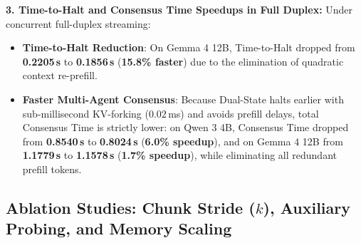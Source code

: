 \documentclass{article}
\begin{document}
\begin{table}[h]
\centering
\caption{\textbf{Comprehensive Token Accounting Breakdown (HANDRAISER Benchmark, 200 Scenarios).} Average tokens processed per scenario with stream length of 63.4 tokens (13.1 chunks of $k=5$).}
\label{tab:token_accounting}
\vspace{0.2cm}
\end{table}

\textbf{3. Time-to-Halt and Consensus Time Speedups in Full Duplex:}
Under concurrent full-duplex streaming:
\begin{itemize}
    \item \textbf{Time-to-Halt Reduction}: On Gemma 4 12B, Time-to-Halt dropped from \textbf{0.2205\,s} to \textbf{0.1856\,s} (\textbf{15.8\% faster}) due to the elimination of quadratic context re-prefill.
    \item \textbf{Faster Multi-Agent Consensus}: Because Dual-State halts earlier with sub-millisecond KV-forking ($0.02$\,ms) and avoids prefill delays, total Consensus Time is strictly lower: on Qwen 3 4B, Consensus Time dropped from \textbf{0.8540\,s} to \textbf{0.8024\,s} (\textbf{6.0\% speedup}), and on Gemma 4 12B from \textbf{1.1779\,s} to \textbf{1.1578\,s} (\textbf{1.7\% speedup}), while eliminating all redundant prefill tokens.
\end{itemize}

\subsection{Ablation Studies: Chunk Stride \texorpdfstring{($k$)}{(k)}, Auxiliary Probing, and Memory Scaling}
\end{document}
